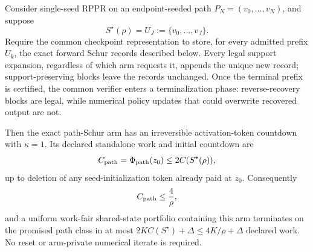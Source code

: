 \begin{theorem}[A $\kappa=1$ shared-state countdown on endpoint paths]
\label{thm:path-token-countdown}
Consider single-seed RPPR on an endpoint-seeded path
$P_N=(v_0,\ldots,v_N)$, and suppose
\[
 S^\star(\rho)=U_J:=\{v_0,\ldots,v_J\}.
\]
Require the common checkpoint representation to store, for every admitted
prefix $U_k$, the exact forward Schur records described below.  Every legal
support expansion, regardless of which arm requests it, appends the unique
new record; support-preserving blocks leave the records unchanged.  Once the
terminal prefix is certified, the common verifier enters a terminalization
phase: reverse-recovery blocks are legal, while numerical policy updates that
could overwrite recovered output are not.

Then the exact path-Schur arm has an irreversible activation-token countdown
with $\kappa=1$.  Its declared standalone work and initial countdown are
\begin{equation}
 C_{\rm path}=\Phi_{\rm path}(z_0)\leq2C(S^\star(\rho)),
 \label{eq:path-token-work}
\end{equation}
up to deletion of any seed-initialization token already paid at $z_0$.
Consequently
\begin{equation}
 C_{\rm path}\leq\frac4\rho,
 \label{eq:path-token-rppr}
\end{equation}
and a uniform work-fair shared-state portfolio containing this arm terminates
on the promised path class in at most
$2K C(S^\star)+\Delta\leq4K/\rho+\Delta$ declared work.  No reset or
arm-private numerical iterate is required.
\end{theorem}

